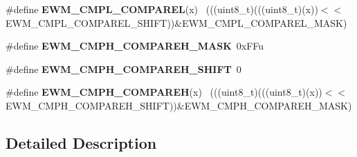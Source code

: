 \begin{DoxyCompactItemize}
\item 
\hypertarget{group___e_w_m___register___masks_ga227fbc36660dcf0e564dd4496832155c}{}\#define {\bfseries E\+W\+M\+\_\+\+C\+M\+P\+L\+\_\+\+C\+O\+M\+P\+A\+R\+E\+L}(x)                                      ~(((uint8\+\_\+t)(((uint8\+\_\+t)(x))$<$$<$E\+W\+M\+\_\+\+C\+M\+P\+L\+\_\+\+C\+O\+M\+P\+A\+R\+E\+L\+\_\+\+S\+H\+I\+F\+T))\&E\+W\+M\+\_\+\+C\+M\+P\+L\+\_\+\+C\+O\+M\+P\+A\+R\+E\+L\+\_\+\+M\+A\+S\+K)\label{group___e_w_m___register___masks_ga227fbc36660dcf0e564dd4496832155c}

\item 
\hypertarget{group___e_w_m___register___masks_ga2bba159a8c0eaace911da192c1747c73}{}\#define {\bfseries E\+W\+M\+\_\+\+C\+M\+P\+H\+\_\+\+C\+O\+M\+P\+A\+R\+E\+H\+\_\+\+M\+A\+S\+K}~0x\+F\+Fu\label{group___e_w_m___register___masks_ga2bba159a8c0eaace911da192c1747c73}

\item 
\hypertarget{group___e_w_m___register___masks_ga02d5e37ee2e38be4d3654c4eb0854cb5}{}\#define {\bfseries E\+W\+M\+\_\+\+C\+M\+P\+H\+\_\+\+C\+O\+M\+P\+A\+R\+E\+H\+\_\+\+S\+H\+I\+F\+T}~0\label{group___e_w_m___register___masks_ga02d5e37ee2e38be4d3654c4eb0854cb5}

\item 
\hypertarget{group___e_w_m___register___masks_ga2aac9dac08a753ede317faba6cd38c39}{}\#define {\bfseries E\+W\+M\+\_\+\+C\+M\+P\+H\+\_\+\+C\+O\+M\+P\+A\+R\+E\+H}(x)                                      ~(((uint8\+\_\+t)(((uint8\+\_\+t)(x))$<$$<$E\+W\+M\+\_\+\+C\+M\+P\+H\+\_\+\+C\+O\+M\+P\+A\+R\+E\+H\+\_\+\+S\+H\+I\+F\+T))\&E\+W\+M\+\_\+\+C\+M\+P\+H\+\_\+\+C\+O\+M\+P\+A\+R\+E\+H\+\_\+\+M\+A\+S\+K)\label{group___e_w_m___register___masks_ga2aac9dac08a753ede317faba6cd38c39}

\end{DoxyCompactItemize}


\subsection{Detailed Description}
